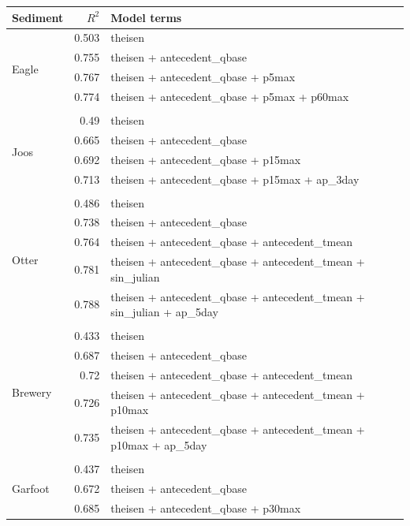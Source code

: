 \documentclass[10pt]{article}
\begin{document}
\begin{table}[h] \small
    \begin{center}
    \begin{tabular}{lrl}
    \textbf{Sediment} & $R^2$ & Model terms \\
    \hline
\multirow{5}{*}{Eagle} & 0.503 & theisen\\ 
 & 0.755 & theisen + antecedent\_qbase\\ 
 & 0.767 & theisen + antecedent\_qbase + p5max\\ 
 & 0.774 & theisen + antecedent\_qbase + p5max + p60max\\ 
\vspace{2mm}\\ \multirow{5}{*}{Joos} & 0.49 & theisen\\ 
 & 0.665 & theisen + antecedent\_qbase\\ 
 & 0.692 & theisen + antecedent\_qbase + p15max\\ 
 & 0.713 & theisen + antecedent\_qbase + p15max + ap\_3day\\ 
\vspace{2mm}\\ \multirow{6}{*}{Otter} & 0.486 & theisen\\ 
 & 0.738 & theisen + antecedent\_qbase\\ 
 & 0.764 & theisen + antecedent\_qbase + antecedent\_tmean\\ 
 & 0.781 & theisen + antecedent\_qbase + antecedent\_tmean + sin\_julian\\ 
 & 0.788 & theisen + antecedent\_qbase + antecedent\_tmean + sin\_julian + ap\_5day\\ 
\vspace{2mm}\\ \multirow{6}{*}{Brewery} & 0.433 & theisen\\ 
 & 0.687 & theisen + antecedent\_qbase\\ 
 & 0.72 & theisen + antecedent\_qbase + antecedent\_tmean\\ 
 & 0.726 & theisen + antecedent\_qbase + antecedent\_tmean + p10max\\ 
 & 0.735 & theisen + antecedent\_qbase + antecedent\_tmean + p10max + ap\_5day\\ 
\vspace{2mm}\\ \multirow{6}{*}{Garfoot} & 0.437 & theisen\\ 
 & 0.672 & theisen + antecedent\_qbase\\ 
 & 0.685 & theisen + antecedent\_qbase + p30max\\ 

\end{tabular}
\end{center}
\end{table}
\end{document}
